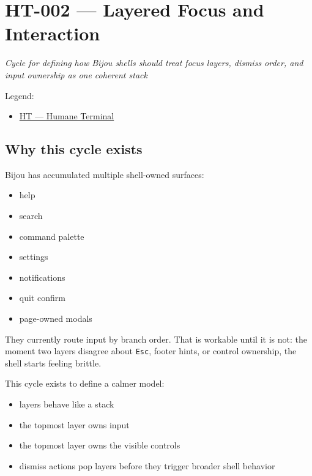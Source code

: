 \chapter{HT-002 --- Layered Focus and Interaction}\label{record-254}

\smallskip

\emph{Cycle for defining how Bijou shells should treat focus layers, dismiss order, and input ownership as one coherent stack}

Legend:

\begin{itemize}
\tightlist
\item
  \href{https://github.com/flyingrobots/bijou/blob/1853ad902f6bf219326409e7f743a5a1d6517dbc/docs/legends/HT-humane-terminal.md}{HT --- Humane Terminal}
\end{itemize}

\section{Why this cycle exists}\label{record-254-why-this-cycle-exists}

Bijou has accumulated multiple shell-owned surfaces:

\begin{itemize}
\tightlist
\item
  help
\item
  search
\item
  command palette
\item
  settings
\item
  notifications
\item
  quit confirm
\item
  page-owned modals
\end{itemize}

They currently route input by branch order. That is workable until it is not: the moment two layers disagree about \texttt{E\allowbreak{}s\allowbreak{}c}, footer hints, or control ownership, the shell starts feeling brittle.

This cycle exists to define a calmer model:

\begin{itemize}
\tightlist
\item
  layers behave like a stack
\item
  the topmost layer owns input
\item
  the topmost layer owns the visible controls
\item
  dismiss actions pop layers before they trigger broader shell behavior
\end{itemize}

